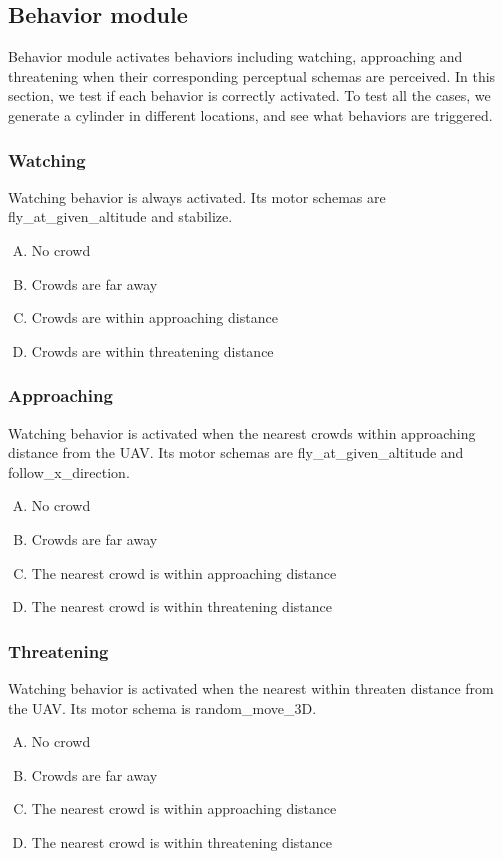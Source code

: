 \subsection{Behavior module}
Behavior module activates behaviors including watching, approaching and threatening when their corresponding perceptual schemas are perceived. In this section, we test if each behavior is correctly activated. To test all the cases, we generate a cylinder in different locations, and see what behaviors are triggered.

\subsubsection{Watching}
Watching behavior is always activated. Its motor schemas are fly\_at\_given\_altitude and stabilize.

\begin{enumerate}[A.]
\item No crowd
\item Crowds are far away
\item Crowds are within approaching distance
\item Crowds are within threatening distance
\end{enumerate}

\subsubsection{Approaching}
Watching behavior is activated when the nearest crowds within approaching distance from the UAV. Its motor schemas are fly\_at\_given\_altitude and follow\_x\_direction. 
\begin{enumerate}[A.]
\item No crowd
\item Crowds are far away
\item The nearest crowd is within approaching distance
\item The nearest crowd is within threatening distance
\end{enumerate}

\subsubsection{Threatening}
Watching behavior is activated when the nearest within threaten distance from the UAV. Its motor schema is random\_move\_3D.
\begin{enumerate}[A.]
\item No crowd
\item Crowds are far away
\item The nearest crowd is within approaching distance
\item The nearest crowd is within threatening distance
\end{enumerate}

